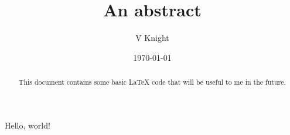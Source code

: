 \documentclass{article} %
\title{An abstract}
\author{V Knight}
\date{\today}
\begin{document}

\begin{abstract}
    This document contains some basic LaTeX code that will be useful to me
    in the future.
\end{abstract}

\maketitle

Hello, world!
\end{document}

